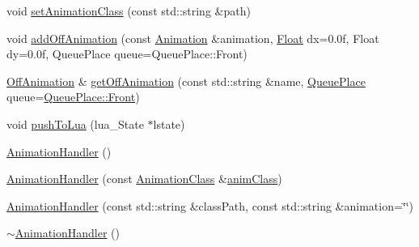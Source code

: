 \begin{DoxyCompactItemize}
\item 
void \hyperlink{classZeta_1_1AnimationHandler_a4d6a67cad171c8b92aafd2c1dd504ff0}{set\+Animation\+Class} (const std\+::string \&path)
\item 
void \hyperlink{classZeta_1_1AnimationHandler_a43b5ff928cb19825ad0bf610611b9c40}{add\+Off\+Animation} (const \hyperlink{classZeta_1_1Animation}{Animation} \&animation, \hyperlink{namespaceZeta_a1e0a1265f9b3bd3075fb0fabd39088ba}{Float} dx=0.\+0f, Float dy=0.\+0f, Queue\+Place queue=\+Queue\+Place\+::\+Front)
\item 
\hyperlink{classZeta_1_1OffAnimation}{Off\+Animation} \& \hyperlink{classZeta_1_1AnimationHandler_a8d7804fcbf7711b387f4ac842423e2e5}{get\+Off\+Animation} (const std\+::string \&name, \hyperlink{classZeta_1_1AnimationHandler_a7b026ece57bb2e774c0367ff0bf15f69}{Queue\+Place} queue=\hyperlink{classZeta_1_1AnimationHandler_a7b026ece57bb2e774c0367ff0bf15f69a5835bab1ade0060909e31a06af2e2cde}{Queue\+Place\+::\+Front})
\item 
void \hyperlink{classZeta_1_1AnimationHandler_a509ac593a41b821d89436f8b7ace13fc}{push\+To\+Lua} (lua\+\_\+\+State $\ast$lstate)
\item 
\hyperlink{classZeta_1_1AnimationHandler_adc5e04e53688506da6b16d9ffa73fea1}{Animation\+Handler} ()
\item 
\hyperlink{classZeta_1_1AnimationHandler_aaa023d298a75cbfdbd8db57fb7f207ee}{Animation\+Handler} (const \hyperlink{classZeta_1_1AnimationClass}{Animation\+Class} \&\hyperlink{classZeta_1_1AnimationHandler_a7b87046e8ddd604eaba79f49a2ee3de5}{anim\+Class})
\item 
\hyperlink{classZeta_1_1AnimationHandler_a49124e8d1738950f3965321fc24a5bf8}{Animation\+Handler} (const std\+::string \&class\+Path, const std\+::string \&animation=\char`\"{}\char`\"{})
\item 
\hyperlink{classZeta_1_1AnimationHandler_aa36e8a645b6bb59a91fc8e8add8208ed}{$\sim$\+Animation\+Handler} ()
\end{DoxyCompactItemize}
